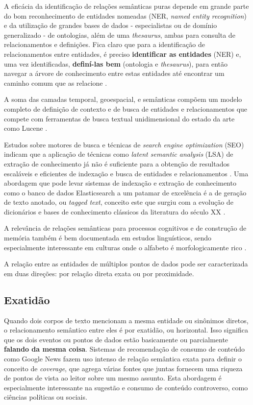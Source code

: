 A eficácia da identificação de relações semânticas puras depende em grande parte do bom reconhecimento de entidades nomeadas (NER, \textit{named entity recognition}) e da utilização de grandes bases de dados - especialistas ou de domínio generalizado - de ontologias, além de uma \textit{thesaurus}, ambas para consulta de relacionamentos e definições. Fica claro que para a identificação de relacionamentos entre entidades, é preciso \textbf{identificar as entidades} (NER) e, uma vez identificadas, \textbf{definí-las bem} (ontologia e \textit{thesaurus}), para então navegar a árvore de conhecimento entre estas entidades até encontrar um caminho comum que as relacione \cite{Amann2000IntegratingOA}.

A soma das camadas temporal, geoespacial, e semânticas compõem um modelo completo de definição de contexto e de busca de entidades e relacionamentos que compete com ferramentas de busca textual unidimensional do estado da arte como Lucene \cite{Li2014TowardsGS}.

Estudos sobre motores de busca e técnicas de \textit{search engine optimization} (SEO) indicam que a aplicação de técnicas como \textit{latent semantic analysis} (LSA) de extração de conhecimento já não é suficiente para a obtenção de resultados escaláveis e eficientes de indexação e busca de entidades e relacionamentos \cite{lsi:seo}. Uma abordagem que pode levar sistemas de indexação e extração de conhecimento como o banco de dados Elasticsearch a um patamar de excelência \cite{elastic:annotated} é a de geração de texto anotado, ou \textit{tagged text}, conceito este que surgiu com a evolução de dicionários e bases de conhecimento clássicos da literatura do século XX \cite{Tompa1989WhatI}. 

A relevância de relações semânticas para processos cognitivos e de construção de memória também é bem documentada em estudos linguísticos, sendo especialmente interessante em culturas onde o alfabeto é morfologicamente rico \cite{Bentin1990TheCO}.

A relação entre as entidades de múltiplos pontos de dados pode ser caracterizada em duas direções: por relação direta exata ou por proximidade.

\subsection{Exatidão}

Quando dois corpos de texto mencionam a mesma entidade ou sinônimos diretos, o relacionamento semântico entre eles é por exatidão, ou horizontal. Isso significa que os dois eventos ou pontos de dados estão basicamente ou parcialmente \textbf{falando da mesma coisa}. Sistemas de recomendação de consumo de conteúdo como Google News fazem uso intenso de relação semântica exata para definir o conceito de \textit{coverage}, que agrega várias fontes que juntas fornecem uma riqueza de pontos de vista ao leitor sobre um mesmo assunto. Esta abordagem é especialmente interessante na sugestão e consumo de conteúdo controverso, como ciências políticas ou sociais.

